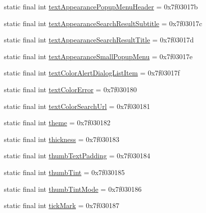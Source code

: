 \begin{DoxyCompactItemize}
\item 
static final int \mbox{\hyperlink{classandroid_1_1support_1_1design_1_1_r_1_1attr_a9fd27705390fdfa05f1175e77fc55215}{text\+Appearance\+Popup\+Menu\+Header}} = 0x7f03017b
\item 
static final int \mbox{\hyperlink{classandroid_1_1support_1_1design_1_1_r_1_1attr_a589eba96297a5cbf1c44b17b52462d47}{text\+Appearance\+Search\+Result\+Subtitle}} = 0x7f03017c
\item 
static final int \mbox{\hyperlink{classandroid_1_1support_1_1design_1_1_r_1_1attr_adfd41707242fb4edba11e3532b4e0e0c}{text\+Appearance\+Search\+Result\+Title}} = 0x7f03017d
\item 
static final int \mbox{\hyperlink{classandroid_1_1support_1_1design_1_1_r_1_1attr_a0456fca18bac043ad1ac869f567a37d2}{text\+Appearance\+Small\+Popup\+Menu}} = 0x7f03017e
\item 
static final int \mbox{\hyperlink{classandroid_1_1support_1_1design_1_1_r_1_1attr_a662d370f1b26a96ef3a6cfb38fd88262}{text\+Color\+Alert\+Dialog\+List\+Item}} = 0x7f03017f
\item 
static final int \mbox{\hyperlink{classandroid_1_1support_1_1design_1_1_r_1_1attr_a7e86019393a4c821c9ad53322dab2114}{text\+Color\+Error}} = 0x7f030180
\item 
static final int \mbox{\hyperlink{classandroid_1_1support_1_1design_1_1_r_1_1attr_a3a48c2a0b795f2f217674c7fd606364e}{text\+Color\+Search\+Url}} = 0x7f030181
\item 
static final int \mbox{\hyperlink{classandroid_1_1support_1_1design_1_1_r_1_1attr_ae8f71f29f7bb0402c673e98fc94ee2fa}{theme}} = 0x7f030182
\item 
static final int \mbox{\hyperlink{classandroid_1_1support_1_1design_1_1_r_1_1attr_ad6da1795dd352215632c62593b260870}{thickness}} = 0x7f030183
\item 
static final int \mbox{\hyperlink{classandroid_1_1support_1_1design_1_1_r_1_1attr_a54e1b26aa0d6ec5ddefa2a11fbf42d9f}{thumb\+Text\+Padding}} = 0x7f030184
\item 
static final int \mbox{\hyperlink{classandroid_1_1support_1_1design_1_1_r_1_1attr_acfdbc1cd87de8b7d0a0f49a5752347e4}{thumb\+Tint}} = 0x7f030185
\item 
static final int \mbox{\hyperlink{classandroid_1_1support_1_1design_1_1_r_1_1attr_ad99fa1d6324c942b77dce306aca37a80}{thumb\+Tint\+Mode}} = 0x7f030186
\item 
static final int \mbox{\hyperlink{classandroid_1_1support_1_1design_1_1_r_1_1attr_a2c15ab478502b879ebe97ef2d4c408b9}{tick\+Mark}} = 0x7f030187

\end{DoxyCompactItemize}
